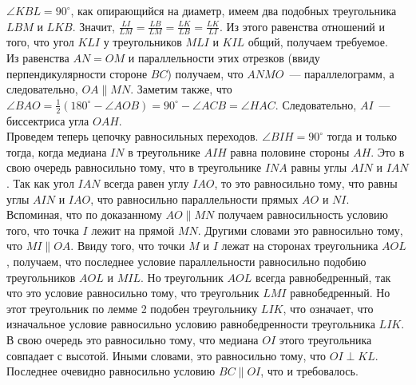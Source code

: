 $\angle KBL = 90^\circ$, как опирающийся на диаметр, имеем два подобных
треугольника $LBM$ и $LKB$.
Значит, $\frac{LI}{LM} = \frac{LB}{LM} = \frac{LK}{LB} = \frac{LK}{LI}$.
Из этого равенства отношений и того, что угол $KLI$ у треугольников $MLI$ и
$KIL$ общий, получаем требуемое.
\\
Из равенства $AN = OM$ и параллельности этих отрезков
(ввиду перпендикулярности стороне $BC$) получаем, что $ANMO$~---
параллелограмм, а следовательно, $OA \parallel MN$.
Заметим также, что
\(
    \angle BAO
=
    \frac{1}{2}(180^\circ - \angle AOB)
=
    90^\circ - \angle ACB = \angle HAC
\).
Следовательно, $AI$~--- биссектриса угла $OAH$.
\\
Проведем теперь цепочку равносильных переходов.
$\angle BIH = 90^\circ$ тогда и только тогда, когда медиана $IN$ в треугольнике
$AIH$ равна половине стороны $AH$.
Это в свою очередь равносильно тому, что в треугольнике $INA$ равны углы $AIN$
и $IAN$.
Так как угол $IAN$ всегда равен углу $IAO$, то это равносильно тому, что равны
углы $AIN$ и $IAO$, что равносильно параллельности прямых $AO$ и $NI$.
Вспоминая, что по доказанному $AO \parallel MN$ получаем равносильность условию
того, что точка $I$ лежит на прямой $MN$.
Другими словами это равносильно тому, что $MI \parallel OA$.
Ввиду того, что точки $M$ и $I$ лежат на сторонах треугольника $AOL$, получаем,
что последнее условие параллельности равносильно подобию треугольников $AOL$ и
$MIL$.
Но треугольник $AOL$ всегда равнобедренный, так что это условие равносильно
тому, что треугольник $LMI$ равнобедренный.
Но этот треугольник по лемме 2 подобен треугольнику $LIK$, что означает, что
изначальное условие равносильно условию равнобедренности треугольника $LIK$.
В свою очередь это равносильно тому, что медиана $OI$ этого треугольника
совпадает с высотой.
Иными словами, это равносильно тому, что $OI \perp KL$.
Последнее очевидно равносильно условию $BC \parallel OI$, что и требовалось.
\endproblem
